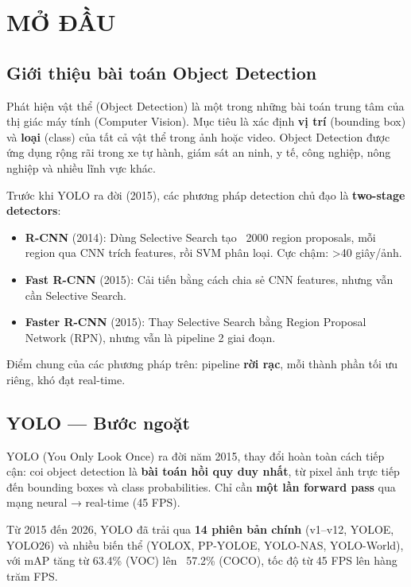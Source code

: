 \chapter{MỞ ĐẦU}

\section{Giới thiệu bài toán Object Detection}

Phát hiện vật thể (Object Detection) là một trong những bài toán trung tâm của thị giác máy tính (Computer Vision). Mục tiêu là xác định \textbf{vị trí} (bounding box) và \textbf{loại} (class) của tất cả vật thể trong ảnh hoặc video. Object Detection được ứng dụng rộng rãi trong xe tự hành, giám sát an ninh, y tế, công nghiệp, nông nghiệp và nhiều lĩnh vực khác.

Trước khi YOLO ra đời (2015), các phương pháp detection chủ đạo là \textbf{two-stage detectors}:
\begin{itemize}
    \item \textbf{R-CNN} (2014): Dùng Selective Search tạo ~2000 region proposals, mỗi region qua CNN trích features, rồi SVM phân loại. Cực chậm: >40 giây/ảnh.
    \item \textbf{Fast R-CNN} (2015): Cải tiến bằng cách chia sẻ CNN features, nhưng vẫn cần Selective Search.
    \item \textbf{Faster R-CNN} (2015): Thay Selective Search bằng Region Proposal Network (RPN), nhưng vẫn là pipeline 2 giai đoạn.
\end{itemize}

Điểm chung của các phương pháp trên: pipeline \textbf{rời rạc}, mỗi thành phần tối ưu riêng, khó đạt real-time.

\section{YOLO — Bước ngoặt}

YOLO (You Only Look Once) ra đời năm 2015, thay đổi hoàn toàn cách tiếp cận: coi object detection là \textbf{bài toán hồi quy duy nhất}, từ pixel ảnh trực tiếp đến bounding boxes và class probabilities. Chỉ cần \textbf{một lần forward pass} qua mạng neural → real-time (45 FPS).

Từ 2015 đến 2026, YOLO đã trải qua \textbf{14 phiên bản chính} (v1--v12, YOLOE, YOLO26) và nhiều biến thể (YOLOX, PP-YOLOE, YOLO-NAS, YOLO-World), với mAP tăng từ 63.4\% (VOC) lên ~57.2\% (COCO), tốc độ từ 45 FPS lên hàng trăm FPS.

